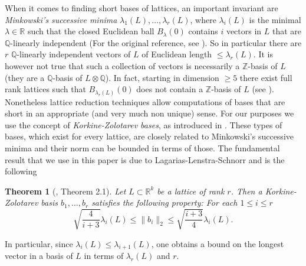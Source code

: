 \documentclass[12pt,a4paper]{amsart}
\newcommand{\RR}{\mathbb{R}}
\newcommand{\ZZ}{\mathbb{Z}}
\newcommand{\QQ}{\mathbb{Q}}
\newtheorem{thm}{Theorem}[section]
\theoremstyle{plain}
\theoremstyle{definition}
\begin{document}
When it comes to finding short bases of lattices, an important invariant are
\emph{Minkowski's successive minima} $\lambda_1(L),\ldots,\lambda_r(L)$, where
$\lambda_i(L)$ is the minimal $\lambda\in \RR$ such that the closed Euclidean ball
$B_\lambda(0)$ contains $i$ vectors in $L$ that are $\QQ$-linearly independent (For the
original reference, see \cite{MR249269}). So in particular 
there are $r$ $\QQ$-linearly independent vectors of $L$ 
of Euclidean length $\leq \lambda_r(L)$. It is however not true that such a collection of
vectors is necessarily a $\ZZ$-basis of $L$ (they are a $\QQ$-basis of $L\otimes \QQ$). In
fact, starting in dimension $\geq 5$ there exist full rank lattices such that
$B_{\lambda_r(L)}(0)$ does not contain a $\ZZ$-basis of $L$ (see \cite[Sect. 5]{MR82513}).
Nonetheless lattice reduction techniques allow computations of bases that are short in an
appropriate (and very much non unique) sense. For our purposes we use the concept of
\emph{Korkine-Zolotarev bases}, as introduced in \cite{MR1509828}. These
types of bases, which exist for every lattice, are closely related to
Minkowski's successive minima and their norm can be bounded in terms of those. The
fundamental result that we use in this paper is due to Lagarias-Lenstra-Schnorr and is the
following

\begin{thm}[\cite{MR1099248}, Theorem 2.1]\label{thm: lattice reduction}
Let $L\subset \RR^k$ be a lattice of rank $r$. Then a Korkine-Zolotarev basis
$b_1,\ldots,b_r$ satisfies the following
property: For each $1\leq i\leq r$ 
\[\sqrt{\frac{4}{i+3}}\lambda_i(L)\leq \|b_i\|_2\leq \sqrt{\frac{i+3}{4}}\lambda_i(L).\]
\end{thm}

In particular, since $\lambda_i(L)\leq \lambda_{i+1}(L)$, one obtains a bound on the longest vector in a basis of $L$ in terms of $\lambda_r(L)$ and $r$.
\end{document}
